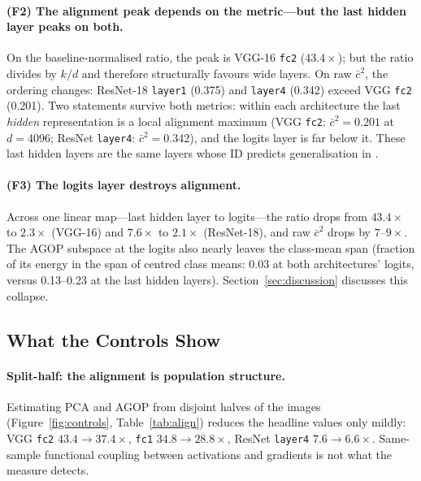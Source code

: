 \documentclass{article}
\newcommand{\kcos}{\bar{c}^2}           %
\begin{document}
\paragraph{(F2) The alignment peak depends on the metric---but the last
hidden layer peaks on both.}
On the baseline-normalised ratio, the peak is VGG-16 \texttt{fc2}
($43.4\times$); but the ratio divides by $k/d$ and therefore structurally
favours wide layers.  On raw $\kcos$, the ordering changes: ResNet-18
\texttt{layer1} (0.375) and \texttt{layer4} (0.342) exceed VGG \texttt{fc2}
(0.201).  Two statements survive both metrics: within each architecture the
last \emph{hidden} representation is a local alignment maximum
(VGG \texttt{fc2}: $\kcos=0.201$ at $d=4096$; ResNet \texttt{layer4}:
$\kcos=0.342$), and the logits layer is far below it.  These last hidden
layers are the same layers whose ID predicts generalisation in
\citet{ansuini2019intrinsic}.

\paragraph{(F3) The logits layer destroys alignment.}
Across one linear map---last hidden layer to logits---the ratio drops from
$43.4\times$ to $2.3\times$ (VGG-16) and $7.6\times$ to $2.1\times$
(ResNet-18), and raw $\kcos$ drops by $7$--$9\times$.  The AGOP subspace at
the logits also nearly leaves the class-mean span (fraction of its energy in
the span of centred class means: 0.03 at both architectures' logits, versus
0.13--0.23 at the last hidden layers).  Section~\ref{sec:discussion}
discusses this collapse.

\subsection{What the Controls Show}
\label{sec:results_controls}

\paragraph{Split-half: the alignment is population structure.}
Estimating PCA and AGOP from disjoint halves of the images
(Figure~\ref{fig:controls}, Table~\ref{tab:align}) reduces the headline
values only mildly: VGG \texttt{fc2} $43.4\!\to\!37.4\times$, \texttt{fc1}
$34.8\!\to\!28.8\times$, ResNet \texttt{layer4} $7.6\!\to\!6.6\times$.
Same-sample functional coupling between activations and gradients is not
what the measure detects.
\end{document}
